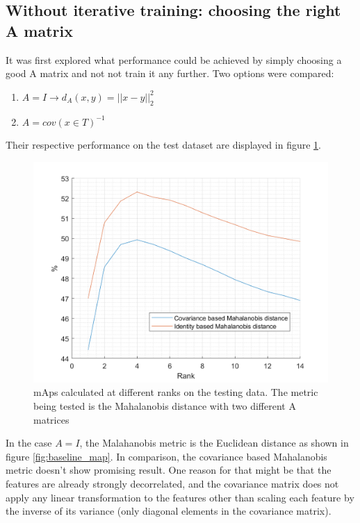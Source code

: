 \documentclass[10pt,technote]{IEEEtran}
\begin{document}
\subsection{Without iterative training: choosing the right A matrix}
It was first explored what performance could be achieved by simply choosing a good A matrix and not not train it any further. Two options were compared:
\begin{enumerate}
    \item $A = I \rightarrow d_A(x, y) = ||x - y||_2^2$
    \item $A = cov(x \in T)^{-1}$
\end{enumerate}
Their respective performance on the test dataset are displayed in figure \ref{fig:maha_map}. 

\begin{figure}
    \centering
    \includegraphics[width=\linewidth]{Graphs/maha_Map.png}
    \caption{mAps calculated at different ranks on the testing data. The metric being tested is the Mahalanobis distance with two different A matrices}
    \label{fig:maha_map}
\end{figure}

In the case $A = I$, the Malahanobis metric is the Euclidean distance as shown in figure \ref{fig:baseline_map}. In comparison, the covariance based Mahalanobis metric doesn't show promising result. One reason for that might be that the features are already strongly decorrelated, and the covariance matrix does not apply any linear transformation to the features other than scaling each feature by the inverse of its variance (only diagonal elements in the covariance matrix). 
\end{document}
